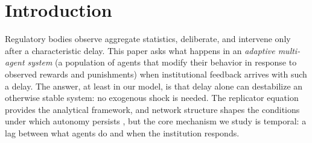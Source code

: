 \section{Introduction}

Regulatory bodies observe aggregate statistics, deliberate, and intervene only after a characteristic delay. This paper asks what happens in an \emph{adaptive multi-agent system} (a population of agents that modify their behavior in response to observed rewards and punishments) when institutional feedback arrives with such a delay. The answer, at least in our model, is that delay alone can destabilize an otherwise stable system: no exogenous shock is needed. The replicator equation \citep{taylor1978evolutionary, hofbauer1998evolutionary} provides the analytical framework, and network structure shapes the conditions under which autonomy persists \citep{nowak2006five, szabo2007evolutionary, lieberman2005evolutionary}, but the core mechanism we study is temporal: a lag between what agents do and when the institution responds.

